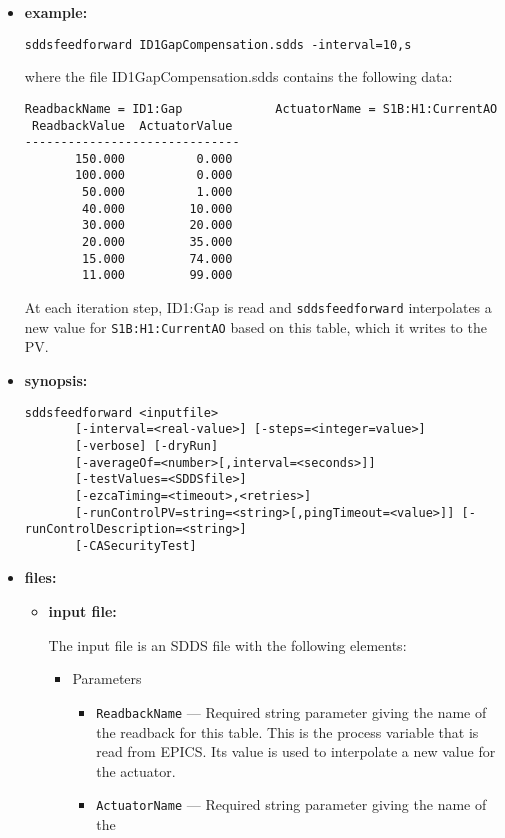 \begin{itemize}
\item {\bf example:} 
%
% 
%
\begin{verbatim}
sddsfeedforward ID1GapCompensation.sdds -interval=10,s 
\end{verbatim}
where the file ID1GapCompensation.sdds contains the following
data:
\begin{verbatim}
ReadbackName = ID1:Gap             ActuatorName = S1B:H1:CurrentAO  
 ReadbackValue  ActuatorValue 
------------------------------
       150.000          0.000 
       100.000          0.000 
        50.000          1.000 
        40.000         10.000 
        30.000         20.000 
        20.000         35.000 
        15.000         74.000 
        11.000         99.000 
\end{verbatim}
At each iteration step, ID1:Gap is read and \verb+sddsfeedforward+ interpolates a new value for
\verb+S1B:H1:CurrentAO+ based on this table, which it writes to the PV.
\item {\bf synopsis:} 
%
%
\begin{verbatim}
sddsfeedforward <inputfile>
       [-interval=<real-value>] [-steps=<integer=value>]
       [-verbose] [-dryRun]
       [-averageOf=<number>[,interval=<seconds>]] 
       [-testValues=<SDDSfile>]
       [-ezcaTiming=<timeout>,<retries>]
       [-runControlPV=string=<string>[,pingTimeout=<value>]] [-runControlDescription=<string>]
       [-CASecurityTest] 
\end{verbatim}
\item {\bf files:}
\begin{itemize}
\item {\bf input file:} \par
The input file is an SDDS file with the following elements:
\begin{itemize}
\item Parameters
\begin{itemize}
\item {\tt ReadbackName} --- Required string parameter giving the name of the
        readback for this table.  This is the process variable that is read from
        EPICS.  Its value is used to interpolate a new value for the actuator.
\item {\tt ActuatorName} --- Required string parameter giving the name of the

\end{itemize}
\end{itemize}
\end{itemize}
\end{itemize}
